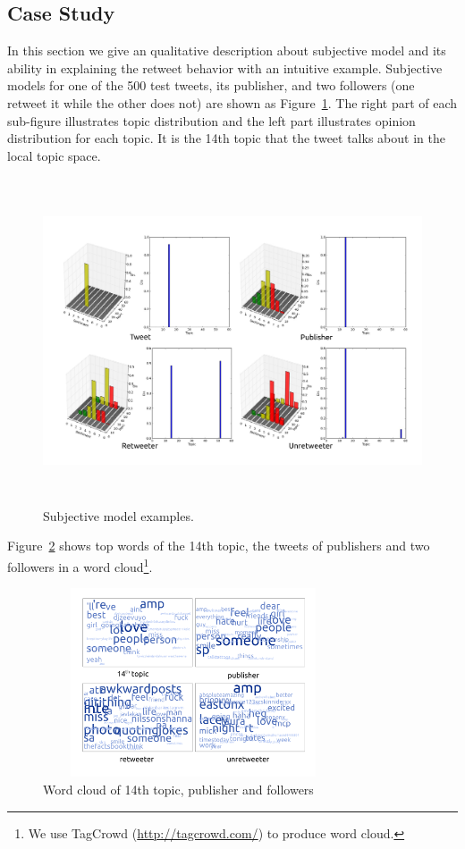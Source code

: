 \documentclass{acm_proc_article-sp}
\begin{document}
\subsection{Case Study}
\label{example}
In this section we give an qualitative description about subjective model and its ability in explaining the retweet behavior with an intuitive example. 
Subjective models for one of the 500 test tweets, its publisher, and two followers (one retweet it while the other does not) are shown as Figure~\ref{fig:graph4}. 
The right part of each sub-figure illustrates topic distribution and the left part illustrates opinion distribution for each topic. 
It is the 14th topic that the tweet talks about in the local topic space.
\begin{figure}[htb]
\centering%
\includegraphics[width=6.5in,height=3.8in]{tweets10.pdf}
\caption{Subjective model examples.}
\label{fig:graph4}
\end{figure}
Figure~\ref{fig:graph5} shows top words of the 14th topic, the tweets of publishers and two followers in a word cloud\footnote{We use TagCrowd (\url{http://tagcrowd.com/}) to produce word cloud.}.
\begin{figure}[htb]
\centering
\includegraphics[width=3.5in,height=2.2in]{text_cloud.pdf}
\caption{Word cloud of 14th topic, publisher and followers}
\label{fig:graph5}
\end{figure}
\end{document}
